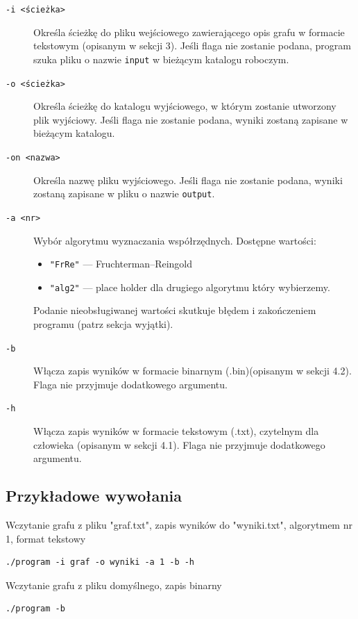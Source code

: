 \documentclass[12pt]{article}
\begin{document}
\begin{description}
	\item[\texttt{-i <ścieżka>}]
	      Określa ścieżkę do pliku wejściowego zawierającego opis grafu w formacie
	      tekstowym (opisanym w sekcji 3). Jeśli flaga nie zostanie podana, program
	      szuka pliku o nazwie \texttt{input} w bieżącym katalogu roboczym.

	\item[\texttt{-o <ścieżka>}]
	      Określa ścieżkę do katalogu wyjściowego, w którym zostanie utworzony plik wyjściowy. 
	      Jeśli flaga nie zostanie podana, wyniki zostaną zapisane w bieżącym katalogu.
    \item[\texttt{-on <nazwa>}]
	      Określa nazwę pliku wyjściowego. Jeśli flaga nie zostanie podana, wyniki zostaną zapisane w pliku o nazwie \texttt{output}.

	\item[\texttt{-a <nr>}]
	      Wybór algorytmu wyznaczania współrzędnych. Dostępne wartości:
	      \begin{itemize}
		      \item \texttt{"FrRe"} — Fruchterman–Reingold
		      \item \texttt{"alg2"} — place holder dla drugiego algorytmu który wybierzemy.
	      \end{itemize}
	      Podanie nieobsługiwanej wartości skutkuje błędem i zakończeniem programu
	      (patrz sekcja wyjątki).

	\item[\texttt{-b}]
	      Włącza zapis wyników w formacie binarnym (.bin)(opisanym w sekcji 4.2).
	      Flaga nie przyjmuje dodatkowego argumentu.

	\item[\texttt{-h}]
	      Włącza zapis wyników w formacie tekstowym (.txt), czytelnym dla człowieka
	      (opisanym w sekcji 4.1). Flaga nie przyjmuje dodatkowego argumentu.
\end{description}

\subsection{Przykładowe wywołania}
Wczytanie grafu z pliku "graf.txt", zapis wyników do "wyniki.txt", algorytmem nr 1, format tekstowy
\begin{verbatim}
./program -i graf -o wyniki -a 1 -b -h
\end{verbatim}
Wczytanie grafu z pliku domyślnego, zapis binarny
\begin{verbatim}
./program -b
\end{verbatim}
\end{document}
